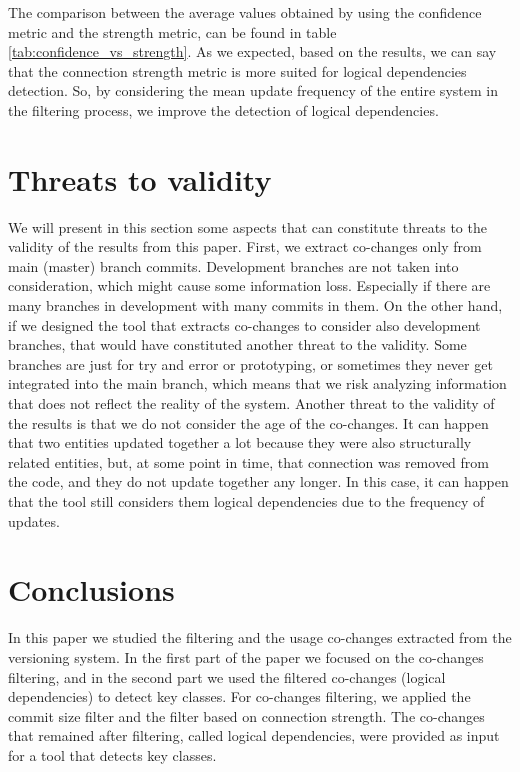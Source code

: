 \documentclass[runningheads]{comsis2}
\begin{document}
The comparison between the average values obtained by using the confidence metric and the strength metric, can be found in table \ref{tab:confidence_vs_strength}.
As we expected, based on the results, we can say that the connection strength metric is more suited for logical dependencies detection. So, by considering the mean update frequency of the entire system in the filtering process, we improve the detection of logical dependencies.

\section{Threats to validity}
\label{sec:threats}
We will present in this section some aspects that can constitute threats to the validity of the results from this paper. First, we extract co-changes only from main (master) branch commits. Development branches are not taken into consideration, which might cause some information loss. Especially if there are many branches in development with many commits in them. On the other hand, if we designed the tool that extracts co-changes to consider also development branches, that would have constituted another threat to the validity. Some branches are just for try and error or prototyping, or sometimes they never get integrated into the main branch, which means that we risk analyzing information that does not reflect the reality of the system.
Another threat to the validity of the results is that we do not consider the age of the co-changes. It can happen that two entities updated together a lot because they were also structurally related entities, but, at some point in time, that connection was removed from the code, and they do not update together any longer. In this case, it can happen that the tool still considers them logical dependencies due to the frequency of updates.

\section{Conclusions}
\label{sec:conclusion}

In this paper we studied the filtering and the usage co-changes extracted from the versioning system. In the first part of the paper we focused on the co-changes filtering, and in the second part we used the filtered co-changes (logical dependencies) to detect key classes.
For co-changes filtering, we applied the commit size filter and the filter based on connection strength. The co-changes that remained after filtering, called logical dependencies, were provided as input for a tool that detects key classes. 
\end{document}
